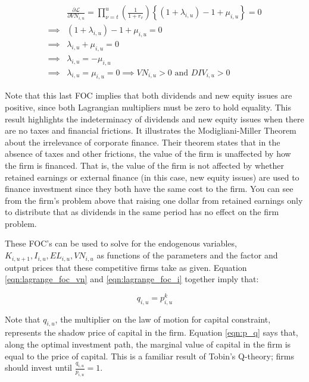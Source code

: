 \documentclass[letterpaper,12pt]{article}
\theoremstyle{definition}
\begin{document}
\begin{spacing}{1.5}
\begin{equation}
\label{eqn:lagrange_foc_vn}
\begin{split}
& \frac{\partial \mathcal{L}}{\partial VN_{i,u}} =   \prod_{\nu=t}^{u} \left(\frac{1}{1+r_{v}}\right) \left\{(1+\lambda_{i,u})- 1 + \mu_{i,u} \right\} = 0 \\
\implies & (1+\lambda_{i,u})- 1  +\mu_{i,u}  = 0 \\
\implies & \lambda_{i,u} + \mu_{i,u}=0  \\
\implies &\lambda_{i,u} = -\mu_{i,u} \\
\implies &  \lambda_{i,u}= \mu_{i,u} =0 \implies  VN_{i,u}>0 \text{ and } DIV_{i,u} > 0
\end{split}
\end{equation}


Note that this last FOC implies that both dividends and new equity issues are positive, since both Lagrangian multipliers must be zero to hold equality.  This result highlights the indeterminacy of dividends and new equity issues when there are no taxes and financial frictions.  It illustrates the Modigliani-Miller Theorem about the irrelevance of corporate finance. Their theorem states that in the absence of taxes and other frictions, the value of the firm is unaffected by how the firm is financed.  That is, the value of the firm is not affected by whether retained earnings or external finance (in this case, new equity issues) are used to finance investment since they both have the same cost to the firm.  You can see from the firm's problem above that raising one dollar from retained earnings only to distribute that as dividends in the same period has no effect on the firm problem.

These FOC's can be used to solve for the endogenous variables, $K_{i,u+1}, I_{i,u}, EL_{i,u}, VN_{i,u}$ as functions of the parameters and the factor and output prices that these competitive firms take as given.  Equation \ref{eqn:lagrange_foc_vn} and \ref{eqn:lagrange_foc_i} together imply that:

\begin{equation}
\label{eqn:q_p}
q_{i,u} = p^{k}_{i,u}
\end{equation}

Note that $q_{i,u}$, the multiplier on the law of motion for capital constraint, represents the shadow price of capital in the firm.  Equation \ref{eqn:p_q} says that, along the optimal investment path, the marginal value of capital in the firm is equal to the price of capital.  This is a familiar result of Tobin's Q-theory; firms should invest until $\frac{q_{i,u}}{p_{i,u}}=1$. 


\end{spacing}
\end{document}
